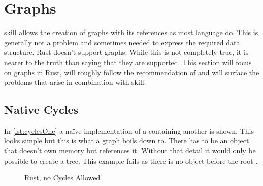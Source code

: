 \documentclass[thesis]{subfiles}
\begin{document}
\section{Graphs}\label{sec:graph}
  \gls{skill} allows the creation of graphs with its references as most language do.
  This is generally not a problem and sometimes needed to express the required data structure.
  Rust doesn't support graphs.
  While this is not completely true, it is nearer to the truth than saying that they are supported.
  This section will focus on graphs in Rust, will roughly follow the recommendation of \autocite{rust-faq} and will surface the problems that arise in combination with \gls{skill}.

  \subsection{Native Cycles}
    In \autoref{lst:cyclesOne} a na\"ive implementation of a \Node containing another \Node is shown.
    This looks simple but this is what a graph boils down to.
    There has to be an object that doesn't own memory but references it.
    Without that detail it would only be possible to create a tree.
    This example fails as there is no \Node object before the root \Node {}.

    \newsavebox{\cyclesOne}
    \begin{lrbox}{\cyclesOne}%
      \begin{minipage}{.45\linewidth}
        
      \end{minipage}
    \end{lrbox}

    \newsavebox{\cyclesTwo}
    \begin{lrbox}{\cyclesTwo}
      \begin{minipage}{.475\linewidth}
        
      \end{minipage}
    \end{lrbox}

    \begin{figure}[ht]
      \captionsetup{type=lstlisting}
       \hfill%
      \caption{Rust, no Cycles Allowed}\label{lst:cycles}
    \end{figure}
\end{document}
